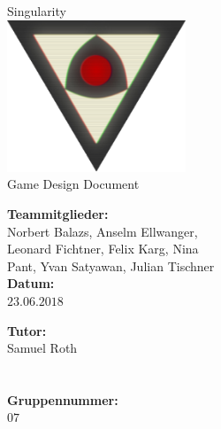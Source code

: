 \documentclass[12pt]{article}
\newcommand{\changefont}[4]{{\fontfamily{#1}\fontsize{#2}{#3}\selectfont #4}} %
\begin{document}
\renewcommand{\figurename}{Fig.}%
\renewcommand{\arraystretch}{1.4}%

\begin{titlepage}
	\begin{center}	
		\changefont{pbk}{32}{35}{Singularity}\\\vspace{3em}
		\includegraphics[width=0.4\textwidth]{res/SingularityLogo2.png}\\\vspace{5em}
		\changefont{cmr}{32}{35}{Game Design Document}
	\end{center}
	\vspace{7em}

	\begin{minipage}[t]{.5\textwidth}
		\begin{center}
			\textbf{Teammitglieder:}\\
			\vspace{.5em}
			Norbert Balazs, Anselm Ellwanger,\\
			Leonard Fichtner, Felix Karg, Nina\\
			Pant, Yvan Satyawan, Julian Tischner\\
			\vspace{2em}
			\textbf{Datum:}\\
			\vspace{.5em}
			$23.06.2018$
		\end{center}
	\end{minipage}
	\begin{minipage}[t]{.5\textwidth}
		\begin{center}
			\textbf{Tutor:}\\
			\vspace{.5em}
			Samuel Roth\\
			\quad\\
			\quad\\
			\vspace{2em}
			\textbf{Gruppennummer:}\\
			\vspace{.5em}
			$07$
		\end{center}
	\end{minipage}
\end{titlepage}
\end{document}
